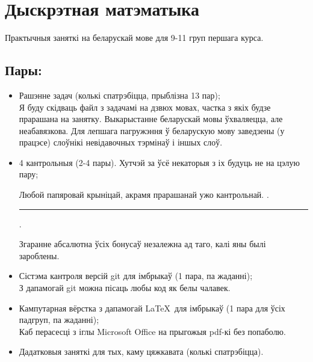 


	\section{Дыскрэтная матэматыка}
	Практычныя заняткі на беларускай мове для 9-11 груп першага курса. 	\subsection{Пары:}
	\begin{itemize}
		\item Рашэнне задач (колькі спатрэбіцца, прыблізна 13 пар); \\[6pt]
		{Я буду скідваць файл з задачамі на дзвюх мовах, частка з якіх будзе прарашана на занятку. Выкарыстанне беларускай мовы ўхваляецца, але неабавязкова. Для лепшага пагружэння ў беларускую мову заведзены (у працэсе) слоўнікі невідавочных тэрмінаў і іншых слоў.}
		\item 4 кантрольныя (2-4 пары). Хутчэй за ўсё некаторыя з іх будуць не на цэлую пару; \\[6pt]
		{Любой папяровай крыніцай, акрамя прарашанай ужо кантрольнай. .\noindent\rule{0.5cm}{0.4pt}. \\[6pt]}
		{Згаранне абсалютна ўсіх бонусаў незалежна ад таго, калі яны былі зароблены.}
		\item Сістэма кантроля версій git для імбрыкаў (1 пара, па жаданні); \\[6pt]
		{З дапамогай git можна пісаць любы код як белы чалавек.}
		\item Кампутарная вёрстка з дапамогай \LaTeX~для імбрыкаў (1 пара для ўсіх падгруп, па жаданні); \\[6pt]
		{Каб перасесці з іглы Microsoft Office на прыгожыя pdf-кі без попаболю.}
		\item Дадатковыя заняткі для тых, каму цяжкавата (колькі спатрэбіцца).
	\end{itemize}

